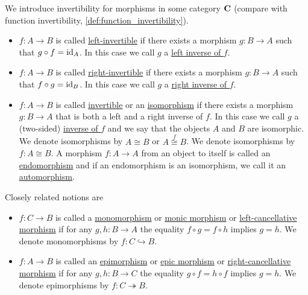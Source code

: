 \begin{definition}\label{def:morphism_invertibility}
  We introduce invertibility for morphisms in some category $\operatorname{\mathbf{C}}$ (compare with function invertibility, \cref{def:function_invertibility}).

  \begin{itemize}
    \item $f: A \to B$ is called \uline{left-invertible} if there exists a morphism $g: B \to A$ such that $g \circ f = \operatorname{id}_A$. In this case we call $g$ a \uline{left inverse of $f$}.

    \item $f: A \to B$ is called \uline{right-invertible} if there exists a morphism $g: B \to A$ such that $f \circ g = \operatorname{id}_B$. In this case we call $g$ a \uline{right inverse of $f$}.

    \item $f: A \to B$ is called \uline{invertible} or an \uline{isomorphism} if there exists a morphism $g: B \to A$ that is both a left and a right inverse of $f$. In this case we call $g$ a (two-sided) \uline{inverse of $f$} and we say that the objects $A$ and $B$ are isomorphic. We denote isomorphisms by $A \cong B$ or $A \overset f \cong B$. We denote isomorphisms by $f: A \cong B$. A morphism $f: A \to A$ from an object to itself is called an \uline{endomorphism} and if an endomorphism is an isomorphism, we call it an \uline{automorphism}.
  \end{itemize}

  Closely related notions are
  \begin{itemize}
    \item $f: C \to B$ is called a \uline{monomorphism} or \uline{monic morphism} or \uline{left-cancellative morphism} if for any $g, h: B \to A$ the equality $f \circ g = f \circ h$ implies $g = h$. We denote monomorphisms by $f: C \hookrightarrow B$.
    \item $f: A \to B$ is called an \uline{epimorphism} or \uline{epic morphism} or \uline{right-cancellative morphism} if for any $g, h: B \to C$ the equality $g \circ f = h \circ f$ implies $g = h$.  We denote epimorphisms by $f: C \twoheadrightarrow B$.
  \end{itemize}
\end{definition}

